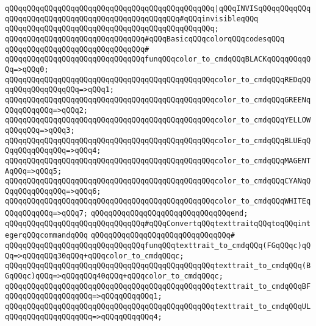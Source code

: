 \verb|qQQqqQQqqQQqqQQqqQQqqQQqqQQqqQQqqQQqqQQqqQQqqQQq|\verb#|qQQqINVISqQQqqQQqqQQqqQQqqQQqqQQqqQQqqQQqqQQqqQQqqQQqqQQqqQQq#\verb|#qQQqinvisibleqQQq|\newline
\verb|qQQqqQQqqQQqqQQqqQQqqQQqqQQqqQQqqQQqqQQqqQQqqQQq;|\newline
\newline
\verb|qQQqqQQqqQQqqQQqqQQqqQQqqQQqqQQq#qQQqBasicqQQqcolorqQQqcodesqQQq|\newline
\verb|qQQqqQQqqQQqqQQqqQQqqQQqqQQqqQQq#|\newline
\verb|qQQqqQQqqQQqqQQqqQQqqQQqqQQqqQQqfunqQQqcolor_to_cmdqQQqBLACKqQQqqQQqqQQq=>qQQq0;|\newline
\verb|qQQqqQQqqQQqqQQqqQQqqQQqqQQqqQQqqQQqqQQqqQQqqQQqcolor_to_cmdqQQqREDqQQqqQQqqQQqqQQqqQQq=>qQQq1;|\newline
\verb|qQQqqQQqqQQqqQQqqQQqqQQqqQQqqQQqqQQqqQQqqQQqqQQqcolor_to_cmdqQQqGREENqQQqqQQqqQQq=>qQQq2;|\newline
\verb|qQQqqQQqqQQqqQQqqQQqqQQqqQQqqQQqqQQqqQQqqQQqqQQqcolor_to_cmdqQQqYELLOWqQQqqQQq=>qQQq3;|\newline
\verb|qQQqqQQqqQQqqQQqqQQqqQQqqQQqqQQqqQQqqQQqqQQqqQQqcolor_to_cmdqQQqBLUEqQQqqQQqqQQqqQQq=>qQQq4;|\newline
\verb|qQQqqQQqqQQqqQQqqQQqqQQqqQQqqQQqqQQqqQQqqQQqqQQqcolor_to_cmdqQQqMAGENTAqQQq=>qQQq5;|\newline
\verb|qQQqqQQqqQQqqQQqqQQqqQQqqQQqqQQqqQQqqQQqqQQqqQQqcolor_to_cmdqQQqCYANqQQqqQQqqQQqqQQq=>qQQq6;|\newline
\verb|qQQqqQQqqQQqqQQqqQQqqQQqqQQqqQQqqQQqqQQqqQQqqQQqcolor_to_cmdqQQqWHITEqQQqqQQqqQQq=>qQQq7;|\newline
\verb|qQQqqQQqqQQqqQQqqQQqqQQqqQQqqQQqend;|\newline
\newline
\verb|qQQqqQQqqQQqqQQqqQQqqQQqqQQqqQQq#qQQqConvertqQQqtexttraitqQQqtoqQQqintegerqQQqcommandqQQq|\newline
\verb|qQQqqQQqqQQqqQQqqQQqqQQqqQQqqQQq#|\newline
\verb|qQQqqQQqqQQqqQQqqQQqqQQqqQQqqQQqfunqQQqtexttrait_to_cmdqQQq(FGqQQqc)qQQq=>qQQqqQQq30qQQq+qQQqcolor_to_cmdqQQqc;|\newline
\verb|qQQqqQQqqQQqqQQqqQQqqQQqqQQqqQQqqQQqqQQqqQQqqQQqtexttrait_to_cmdqQQq(BGqQQqc)qQQq=>qQQqqQQq40qQQq+qQQqcolor_to_cmdqQQqc;|\newline
\verb|qQQqqQQqqQQqqQQqqQQqqQQqqQQqqQQqqQQqqQQqqQQqqQQqtexttrait_to_cmdqQQqBFqQQqqQQqqQQqqQQqqQQq=>qQQqqQQqqQQq1;|\newline
\verb|qQQqqQQqqQQqqQQqqQQqqQQqqQQqqQQqqQQqqQQqqQQqqQQqtexttrait_to_cmdqQQqULqQQqqQQqqQQqqQQqqQQq=>qQQqqQQqqQQq4;|\newline
